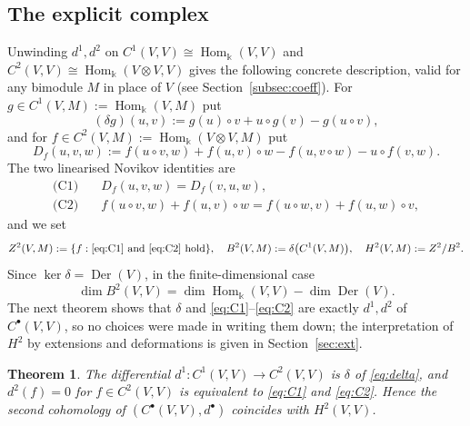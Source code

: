 \documentclass[11pt,reqno]{amsart}
\theoremstyle{plain}
\newtheorem{theorem}{Theorem}[section]
\theoremstyle{definition}
\DeclareMathOperator{\Der}{Der}
\DeclareMathOperator{\Hom}{Hom}
\newcommand{\kk}{\Bbbk}
\newcommand{\Zt}{Z^2}
\newcommand{\Bt}{B^2}
\newcommand{\Ht}{H^2}
\begin{document}
\subsection{The explicit complex}\label{subsec:operadic-explicit}
Unwinding $d^1,d^2$ on $C^1(V,V)\cong\Hom_\kk(V,V)$ and $C^2(V,V)\cong\Hom_\kk(V\otimes V,V)$
gives the following concrete description, valid for any bimodule $M$ in place of $V$ (see
Section~\ref{subsec:coeff}). For $g\in C^1(V,M):=\Hom_\kk(V,M)$ put
\begin{equation}
(\delta g)(u,v):=g(u)\circ v+u\circ g(v)-g(u\circ v),
\label{eq:delta}
\end{equation}
and for $f\in C^2(V,M):=\Hom_\kk(V\otimes V,M)$ put
\[
D_f(u,v,w):=f(u\circ v,w)+f(u,v)\circ w-f(u,v\circ w)-u\circ f(v,w).
\]
The two linearised Novikov identities are
\begin{align}
\text{(C1)}\quad & D_f(u,v,w)=D_f(v,u,w),\label{eq:C1}\\
\text{(C2)}\quad & f(u\circ v,w)+f(u,v)\circ w=f(u\circ w,v)+f(u,w)\circ v,\label{eq:C2}
\end{align}
and we set
\[
\Zt(V,M):=\{f:\text{\eqref{eq:C1} and \eqref{eq:C2} hold}\},\quad
\Bt(V,M):=\delta\bigl(C^1(V,M)\bigr),\quad \Ht(V,M):=\Zt/\Bt .
\]
Since $\ker\delta=\Der(V)$, in the finite-dimensional case
\begin{equation}
\dim\Bt(V,V)=\dim\Hom_\kk(V,V)-\dim\Der(V).
\label{eq:B2dim}
\end{equation}
The next theorem shows that $\delta$ and \eqref{eq:C1}--\eqref{eq:C2} are exactly $d^1,d^2$
of $C^\bullet(V,V)$, so no choices were made in writing them down; the interpretation of
$\Ht$ by extensions and deformations is given in Section~\ref{sec:ext}.

\begin{theorem}\label{thm:operadic}
The differential $d^1:C^1(V,V)\to C^2(V,V)$ is $\delta$ of \eqref{eq:delta}, and
$d^2(f)=0$ for $f\in C^2(V,V)$ is equivalent to \eqref{eq:C1} and \eqref{eq:C2}. Hence the
second cohomology of $(C^\bullet(V,V),d^\bullet)$ coincides with $\Ht(V,V)$.
\end{theorem}
\end{document}
